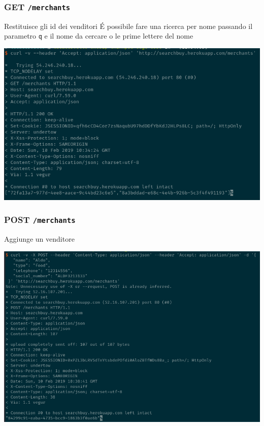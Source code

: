 \documentclass[11pt]{article}
\begin{document}
\subsubsection{GET \texttt{/merchants}}
\label{sec:orgf454c8e}
Restituisce gli id dei venditori
É possibile fare una ricerca per nome passando il parametro \texttt{q} e il nome da cercare o le prime lettere del nome
\begin{center}
\includegraphics[width=.9\linewidth]{img/merchants-screen/get-merchants.png}
\end{center}
\subsubsection{POST \texttt{/merchants}}
\label{sec:org1018240}
Aggiunge un venditore
\begin{center}
\includegraphics[width=.9\linewidth]{img/merchants-screen/post-merchants.png}
\end{center}
\end{document}
